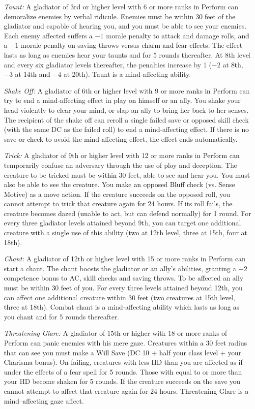 \textit{Taunt:} A gladiator of 3rd or higher level with 6 or more ranks in Perform can demoralize enemies by verbal ridicule. Enemies must be within 30 feet of the gladiator and capable of hearing you, and you must be able to see your enemies. Each enemy affected suffers a $-1$ morale penalty to attack and damage rolls, and a $-1$ morale penalty on saving throws versus charm and fear effects. The effect lasts as long as enemies hear your taunts and for 5 rounds thereafter. At 8th level and every six gladiator levels thereafter, the penalties increase by 1 ($-2$ at 8th, $-3$ at 14th and $-4$ at 20th). Taunt is a mind‐affecting ability.

\textit{Shake Off:} A gladiator of 6th or higher level with 9 or more ranks in Perform can try to end a mind‐affecting effect in play on himself or an ally. You shake your head violently to clear your mind, or slap an ally to bring her back to her senses. The recipient of the shake off can reroll a single failed save or opposed skill check (with the same DC as the failed roll) to end a mind‐affecting effect. If there is no save or check to avoid the mind‐affecting effect, the effect ends automatically.

\textit{Trick:} A gladiator of 9th or higher level with 12 or more ranks in Perform can temporarily confuse an adversary through the use of ploy and deception. The creature to be tricked must be within 30 feet, able to see and hear you. You must also be able to see the creature. You make an opposed Bluff check (vs. Sense Motive) as a move action. If the creature succeeds on the opposed roll, you cannot attempt to trick that creature again for 24 hours. If its roll fails, the creature becomes dazed (unable to act, but can defend normally) for 1 round. For every three gladiator levels attained beyond 9th, you can target one additional creature with a single use of this ability (two at 12th level, three at 15th, four at 18th).

\textit{Chant:} A gladiator of 12th or higher level with 15 or more ranks in Perform can start a chant. The chant boosts the gladiator or an ally’s abilities, granting a +2 competence bonus to AC, skill checks and saving throws. To be affected an ally must be within 30 feet of you. For every three levels attained beyond 12th, you can affect one additional creature within 30 feet (two creatures at 15th level, three at 18th). Combat chant is a mind‐affecting ability which lasts as long as you chant and for 5 rounds thereafter.

\textit{Threatening Glare:} A gladiator of 15th or higher with 18 or more ranks of Perform can panic enemies with his mere gaze. Creatures within a 30 feet radius that can see you must make a Will Save (DC 10 + half your class level + your Charisma bonus). On failing, creatures with less HD than you are affected as if under the effects of a fear spell for 5 rounds. Those with equal to or more than your HD become shaken for 5 rounds. If the creature succeeds on the save you cannot attempt to affect that creature again for 24 hours. Threatening Glare is a mind–affecting gaze affect.

